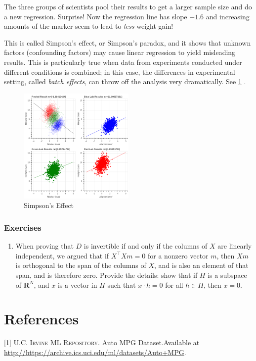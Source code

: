 \documentclass[]{article}
\providecommand{\tightlist}{%
  \setlength{\itemsep}{0pt}\setlength{\parskip}{0pt}}
\begin{document}
The three groups of scientists pool their results to get a larger sample
size and do a new regression. Surprise! Now the regression line has
slope \(-1.6\) and increasing amounts of the marker seem to lead to
\emph{less} weight gain!

This is called Simpson's effect, or Simpson's paradox, and it shows that
unknown factors (confounding factors) may cause linear regression to
yield misleading results. This is particularly true when data from
experiments conducted under different conditions is combined; in this
case, the differences in experimental setting, called \emph{batch
effects}, can throw off the analysis very dramatically. See
\cref{fig:simpsons} .

\begin{figure}
\hypertarget{fig:simpsons}{%
\centering
\includegraphics[width=0.5\textwidth,height=\textheight]{../img/SimpsonsEffect.png}
\caption{Simpson's Effect}\label{fig:simpsons}
}
\end{figure}

\hypertarget{exercises-1}{%
\subsubsection{Exercises}\label{exercises-1}}

\begin{enumerate}
\def\labelenumi{\arabic{enumi}.}
\tightlist
\item
  When proving that \(D\) is invertible if and only if the columns of
  \(X\) are linearly independent, we argued that if
  \(X^{\intercal}Xm=0\) for a nonzero vector \(m\), then \(Xm\) is
  orthogonal to the span of the columns of \(X\), and is also an element
  of that span, and is therefore zero. Provide the details: show that if
  \(H\) is a subspace of \(\mathbf{R}^{N}\), and \(x\) is a vector in
  \(H\) such that \(x\cdot h=0\) for all \(h\in H\), then \(x=0\).
\end{enumerate}

\hypertarget{bibliography}{%
\section*{References}\label{bibliography}}

\hypertarget{refs}{}
\leavevmode\hypertarget{ref-irvine}{}%
{[}1{]} \textsc{U.C. Irvine ML Repository}. Auto MPG Dataset.Available
at \url{http://https://archive.ics.uci.edu/ml/datasets/Auto+MPG}.
\end{document}
